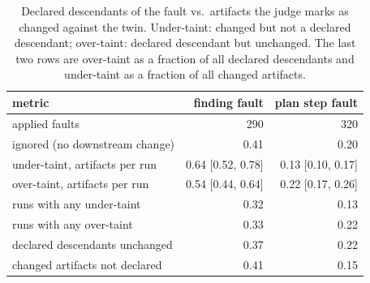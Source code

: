 \begin{table}[t]
\centering
\small
\begin{tabular}{lrr}
\toprule
metric & finding fault & plan step fault \\
\midrule
applied faults & 290 & 320 \\
ignored (no downstream change) & 0.41 & 0.20 \\
under-taint, artifacts per run & 0.64 [0.52, 0.78] & 0.13 [0.10, 0.17] \\
over-taint, artifacts per run & 0.54 [0.44, 0.64] & 0.22 [0.17, 0.26] \\
runs with any under-taint & 0.32 & 0.13 \\
runs with any over-taint & 0.33 & 0.22 \\
declared descendants unchanged & 0.37 & 0.22 \\
changed artifacts not declared & 0.41 & 0.15 \\
\bottomrule
\end{tabular}
\caption{Declared descendants of the fault vs.\ artifacts the judge marks as changed against the twin. Under-taint: changed but not a declared descendant; over-taint: declared descendant but unchanged. The last two rows are over-taint as a fraction of all declared descendants and under-taint as a fraction of all changed artifacts.}
\label{tab:taint}
\end{table}
